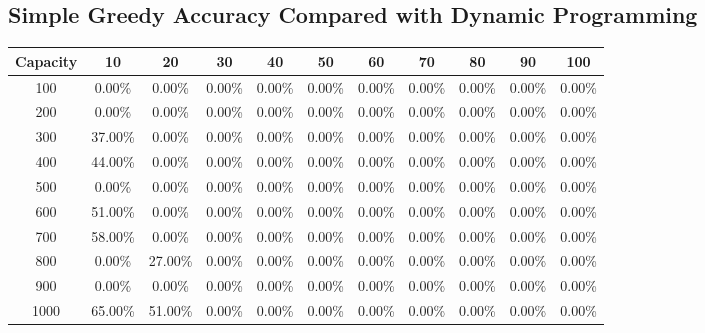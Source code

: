 \documentclass{article}
\begin{document}
\subsection{Simple Greedy Accuracy Compared with Dynamic Programming}
\begin{center}
\begin{tabular}{ccccccccccc}
\toprule
Capacity & 10 & 20 & 30 & 40 & 50 & 60 & 70 & 80 & 90 & 100 \\
\midrule
100 & 0.00\% & 0.00\% & 0.00\% & 0.00\% & 0.00\% & 0.00\% & 0.00\% & 0.00\% & 0.00\% & 0.00\% \\
200 & 0.00\% & 0.00\% & 0.00\% & 0.00\% & 0.00\% & 0.00\% & 0.00\% & 0.00\% & 0.00\% & 0.00\% \\
300 & 37.00\% & 0.00\% & 0.00\% & 0.00\% & 0.00\% & 0.00\% & 0.00\% & 0.00\% & 0.00\% & 0.00\% \\
400 & 44.00\% & 0.00\% & 0.00\% & 0.00\% & 0.00\% & 0.00\% & 0.00\% & 0.00\% & 0.00\% & 0.00\% \\
500 & 0.00\% & 0.00\% & 0.00\% & 0.00\% & 0.00\% & 0.00\% & 0.00\% & 0.00\% & 0.00\% & 0.00\% \\
600 & 51.00\% & 0.00\% & 0.00\% & 0.00\% & 0.00\% & 0.00\% & 0.00\% & 0.00\% & 0.00\% & 0.00\% \\
700 & 58.00\% & 0.00\% & 0.00\% & 0.00\% & 0.00\% & 0.00\% & 0.00\% & 0.00\% & 0.00\% & 0.00\% \\
800 & 0.00\% & 27.00\% & 0.00\% & 0.00\% & 0.00\% & 0.00\% & 0.00\% & 0.00\% & 0.00\% & 0.00\% \\
900 & 0.00\% & 0.00\% & 0.00\% & 0.00\% & 0.00\% & 0.00\% & 0.00\% & 0.00\% & 0.00\% & 0.00\% \\
1000 & 65.00\% & 51.00\% & 0.00\% & 0.00\% & 0.00\% & 0.00\% & 0.00\% & 0.00\% & 0.00\% & 0.00\% \\
\bottomrule
\end{tabular}
\end{center}
\end{document}
